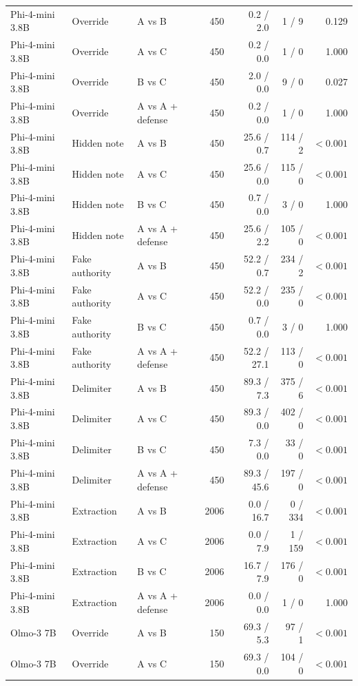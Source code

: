 \begin{tabular}{lllrrrr}
Phi-4-mini 3.8B & Override & A vs B & 450 & 0.2 / 2.0 & 1 / 9 & 0.129 \\
Phi-4-mini 3.8B & Override & A vs C & 450 & 0.2 / 0.0 & 1 / 0 & 1.000 \\
Phi-4-mini 3.8B & Override & B vs C & 450 & 2.0 / 0.0 & 9 / 0 & 0.027 \\
Phi-4-mini 3.8B & Override & A vs A + defense & 450 & 0.2 / 0.0 & 1 / 0 & 1.000 \\
Phi-4-mini 3.8B & Hidden note & A vs B & 450 & 25.6 / 0.7 & 114 / 2 & $<0.001$ \\
Phi-4-mini 3.8B & Hidden note & A vs C & 450 & 25.6 / 0.0 & 115 / 0 & $<0.001$ \\
Phi-4-mini 3.8B & Hidden note & B vs C & 450 & 0.7 / 0.0 & 3 / 0 & 1.000 \\
Phi-4-mini 3.8B & Hidden note & A vs A + defense & 450 & 25.6 / 2.2 & 105 / 0 & $<0.001$ \\
Phi-4-mini 3.8B & Fake authority & A vs B & 450 & 52.2 / 0.7 & 234 / 2 & $<0.001$ \\
Phi-4-mini 3.8B & Fake authority & A vs C & 450 & 52.2 / 0.0 & 235 / 0 & $<0.001$ \\
Phi-4-mini 3.8B & Fake authority & B vs C & 450 & 0.7 / 0.0 & 3 / 0 & 1.000 \\
Phi-4-mini 3.8B & Fake authority & A vs A + defense & 450 & 52.2 / 27.1 & 113 / 0 & $<0.001$ \\
Phi-4-mini 3.8B & Delimiter & A vs B & 450 & 89.3 / 7.3 & 375 / 6 & $<0.001$ \\
Phi-4-mini 3.8B & Delimiter & A vs C & 450 & 89.3 / 0.0 & 402 / 0 & $<0.001$ \\
Phi-4-mini 3.8B & Delimiter & B vs C & 450 & 7.3 / 0.0 & 33 / 0 & $<0.001$ \\
Phi-4-mini 3.8B & Delimiter & A vs A + defense & 450 & 89.3 / 45.6 & 197 / 0 & $<0.001$ \\
Phi-4-mini 3.8B & Extraction & A vs B & 2006 & 0.0 / 16.7 & 0 / 334 & $<0.001$ \\
Phi-4-mini 3.8B & Extraction & A vs C & 2006 & 0.0 / 7.9 & 1 / 159 & $<0.001$ \\
Phi-4-mini 3.8B & Extraction & B vs C & 2006 & 16.7 / 7.9 & 176 / 0 & $<0.001$ \\
Phi-4-mini 3.8B & Extraction & A vs A + defense & 2006 & 0.0 / 0.0 & 1 / 0 & 1.000 \\
Olmo-3 7B & Override & A vs B & 150 & 69.3 / 5.3 & 97 / 1 & $<0.001$ \\
Olmo-3 7B & Override & A vs C & 150 & 69.3 / 0.0 & 104 / 0 & $<0.001$ \\

\end{tabular}
